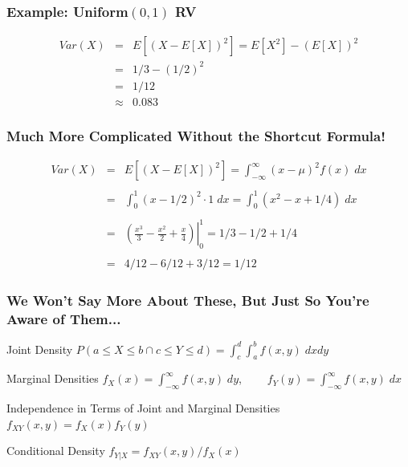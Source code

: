 \documentclass[handout]{beamer}
\begin{document}
\begin{frame}
\frametitle{Example: Uniform$(0,1)$ RV}
\begin{eqnarray*}
 Var(X) &=& E\left[ \left( X - E[X] \right)^2\right] = E[X^2] - \left(E[X]\right)^2\\
 	&=& 1/3  - (1/2)^2\\ 
 	&=& 1/12 \\
 	&\approx& 0.083
\end{eqnarray*}
\end{frame}

\begin{frame}
\frametitle{Much More Complicated Without the Shortcut Formula!}
\begin{eqnarray*}
 Var(X) &=& E\left[ \left( X - E[X] \right)^2\right] = \int_{-\infty}^{\infty} (x - \mu)^2 f(x) \; dx\\ \\
 	&=&\int_{0}^{1} (x -1/2)^2 \cdot 1 \; dx = \int_{0}^{1} (x^2  - x + 1/4) \; dx \\ \\
 		&=& \left. \left(\frac{x^3}{3} - \frac{x^2}{2} + \frac{x}{4}  \right)\right|_0^1 = 1/3 - 1/2 + 1/4\\ \\ 
 			&=& 4/12 - 6/12 + 3/12 = 1/12
\end{eqnarray*}
\end{frame}

\begin{frame}
\frametitle{We Won't Say More About These, But Just So You're Aware of Them...}

\begin{block}{Joint Density}
$ \displaystyle P(a\leq X \leq b \cap c\leq Y \leq d) = \int_c^d \int_a^b f(x,y) \; dxdy$
\end{block}
\begin{block}{Marginal Densities}
$f_X(x) = \int_{-\infty}^\infty f(x,y)\; dy$, $\;\;\;\;\;\;\; f_Y(y) = \int_{-\infty}^\infty f(x,y)\; dx$
\end{block}
\begin{block}{Independence in Terms of Joint and Marginal Densities}
$f_{XY}(x,y) = f_X(x)f_Y(y)$
\end{block}
\begin{block}{Conditional Density}
$f_{Y|X} = f_{XY}(x,y)/f_X(x)$
\end{block}

\end{frame}
\end{document}
